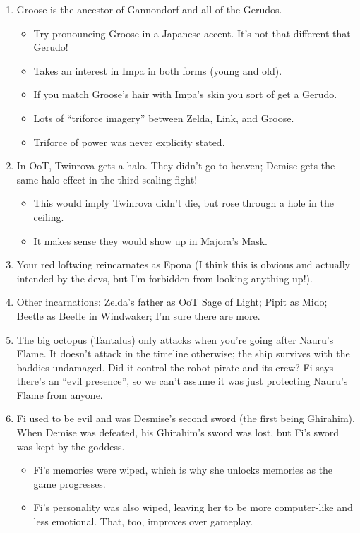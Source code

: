 \begin{enumerate}
	\item{Groose is the ancestor of Gannondorf and all of the Gerudos.
		\begin{itemize}
			\item{Try pronouncing Groose in a Japanese accent. It's not that different that Gerudo!}
			\item{Takes an interest in Impa in both forms (young and old).}
			\item{If you match Groose's hair with Impa's skin you sort of get a Gerudo.}
			\item{Lots of ``triforce imagery'' between Zelda, Link, and Groose.} 
			\item{Triforce of power was never explicity stated.}
		\end{itemize}
	}
	\item{In OoT, Twinrova gets a halo. They didn't go to heaven; Demise gets the same halo effect in the third sealing fight!
		\begin{itemize}
			\item{This would imply Twinrova didn't die, but rose through a hole in the ceiling.}
			\item{It makes sense they would show up in Majora's Mask.}
		\end{itemize}
	}
	\item{Your red loftwing reincarnates as Epona (I think this is obvious and actually intended by the devs, but I'm forbidden from looking anything up!).}
	\item{Other incarnations: Zelda's father as OoT Sage of Light; Pipit as Mido; Beetle as Beetle in Windwaker; I'm sure there are more.}
	\item{The big octopus (Tantalus) only attacks when you're going after Nauru's Flame. It doesn't attack in the timeline otherwise; the ship survives with the baddies undamaged. Did it control the robot pirate and its crew? Fi says there's an ``evil presence'', so we can't assume it was just protecting Nauru's Flame from anyone.}
	\item{Fi used to be evil and was Desmise's second sword (the first being Ghirahim). When Demise was defeated, his Ghirahim's sword was lost, but Fi's sword was kept by the goddess.
		\begin{itemize}
			\item{Fi's memories were wiped, which is why she unlocks memories as the game progresses.}
			\item{Fi's personality was also wiped, leaving her to be more computer-like and less emotional. That, too, improves over gameplay.}

\end{itemize}}
\end{enumerate}
